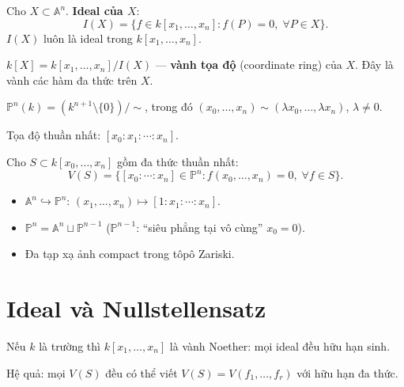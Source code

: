 \documentclass[12pt,a4paper]{article}
\begin{document}
\begin{dinhnghia}[title={Ideal tập đại số}]
  Cho $X \subset \mathbb{A}^n$. \textbf{Ideal của $X$}:
  \[
    I(X) = \{f \in k[x_1, \ldots, x_n] : f(P) = 0,\;\forall P \in X\}.
  \]
  $I(X)$ luôn là ideal trong $k[x_1, \ldots, x_n]$.
\end{dinhnghia}

\begin{dinhnghia}[title={Vành tọa độ}]
  $k[X] = k[x_1, \ldots, x_n] / I(X)$ --- \textbf{vành tọa độ} (coordinate ring) của $X$. Đây là vành các hàm đa thức trên $X$.
\end{dinhnghia}

\begin{dinhnghia}[title={Không gian xạ ảnh $\mathbb{P}^n$}]
  $\mathbb{P}^n(k) = (k^{n+1} \setminus \{0\}) / {\sim}$, trong đó $(x_0, \ldots, x_n) \sim (\lambda x_0, \ldots, \lambda x_n)$, $\lambda \ne 0$.

  Tọa độ thuần nhất: $[x_0 : x_1 : \cdots : x_n]$.
\end{dinhnghia}

\begin{dinhnghia}[title={Đa tạp xạ ảnh}]
  Cho $S \subset k[x_0, \ldots, x_n]$ gồm đa thức thuần nhất:
  \[
    V(S) = \{[x_0 : \cdots : x_n] \in \mathbb{P}^n : f(x_0, \ldots, x_n) = 0,\;\forall f \in S\}.
  \]
\end{dinhnghia}

\begin{tinhchat}[title={Quan hệ affine -- xạ ảnh}]
  \begin{itemize}
    \item $\mathbb{A}^n \hookrightarrow \mathbb{P}^n$: $(x_1, \ldots, x_n) \mapsto [1 : x_1 : \cdots : x_n]$.
    \item $\mathbb{P}^n = \mathbb{A}^n \sqcup \mathbb{P}^{n-1}$ ($\mathbb{P}^{n-1}$: ``siêu phẳng tại vô cùng'' $x_0 = 0$).
    \item Đa tạp xạ ảnh compact trong tôpô Zariski.
  \end{itemize}
\end{tinhchat}

\section{Ideal và Nullstellensatz}

\begin{dinhly}[title={Định lý cơ sở Hilbert (Hilbert Basis Theorem)}]
  Nếu $k$ là trường thì $k[x_1, \ldots, x_n]$ là vành Noether: mọi ideal đều hữu hạn sinh.

  Hệ quả: mọi $V(S)$ đều có thể viết $V(S) = V(f_1, \ldots, f_r)$ với hữu hạn đa thức.
\end{dinhly}
\end{document}
